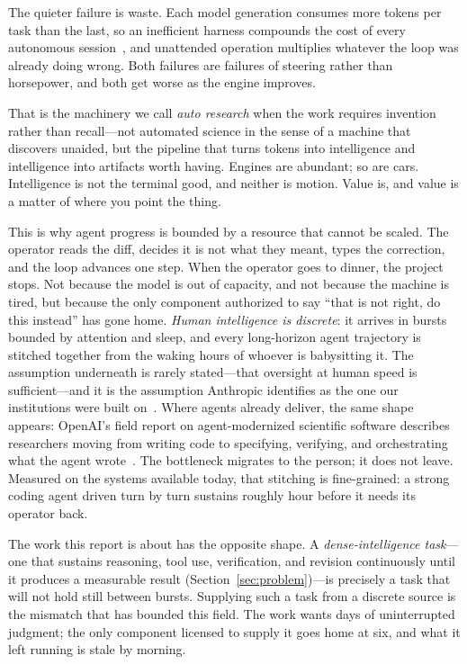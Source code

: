 The quieter failure is waste. Each model generation consumes more tokens per task
than the last, so an inefficient harness compounds the cost of every autonomous
session~\citep{caldwell2026tokenefficiency}, and unattended operation multiplies
whatever the loop was already doing wrong. Both failures are failures of steering
rather than horsepower, and both get worse as the engine improves.

That is the machinery we call \emph{auto research} when the work requires invention
rather than recall---not automated science in the sense of a machine that discovers
unaided, but the pipeline that turns tokens into intelligence and intelligence into
artifacts worth having. Engines are abundant; so are cars. Intelligence is not the
terminal good, and neither is motion. Value is, and value is a matter of where you
point the thing.

This is why agent progress is bounded by a resource that cannot be scaled. The
operator reads the diff, decides it is not what they meant, types the correction,
and the loop advances one step. When the operator goes to dinner, the project stops.
Not because the model is out of capacity, and not because the machine is tired, but
because the only component authorized to say ``that is not right, do this instead''
has gone home. \emph{Human intelligence is discrete}: it arrives in bursts bounded
by attention and sleep, and every long-horizon agent trajectory is stitched together
from the waking hours of whoever is babysitting it. The assumption underneath is
rarely stated---that oversight at human speed is sufficient---and it is the
assumption Anthropic identifies as the one our institutions were built
on~\citep{anthropic2026multiagent}. Where agents already deliver, the same shape
appears: OpenAI's field report on agent-modernized scientific software describes
researchers moving from writing code to specifying, verifying, and orchestrating what
the agent wrote~\citep{openai2026sciencecomputing}. The bottleneck migrates to the
person; it does not leave. Measured on the systems available
today, that stitching is fine-grained: a strong coding agent driven turn by turn
sustains roughly \CodexEndurance{} hour before it needs its operator back.

The work this report is about has the opposite shape. A \emph{dense-intelligence
task}---one that sustains reasoning, tool use, verification, and revision
continuously until it produces a measurable result (Section~\ref{sec:problem})---is
precisely a task that will not hold still between bursts. Supplying such a task from
a discrete source is the mismatch that has bounded this field. The work wants days of
uninterrupted judgment; the only component licensed to supply it goes home at six,
and what it left running is stale by morning.

